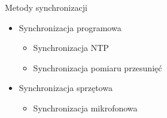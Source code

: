 \begin{frame}
    \begin{block}{Metody synchronizacji}
        \begin{itemize}
            \item Synchronizacja programowa
                \begin{itemize}
                    \item Synchronizacja NTP
                    \item Synchronizacja pomiaru przesunięć
                \end{itemize}
            \item Synchronizacja sprzętowa
                \begin{itemize}
                    \item Synchronizacja mikrofonowa
                \end{itemize}
        \end{itemize}
    \end{block}
\end{frame}